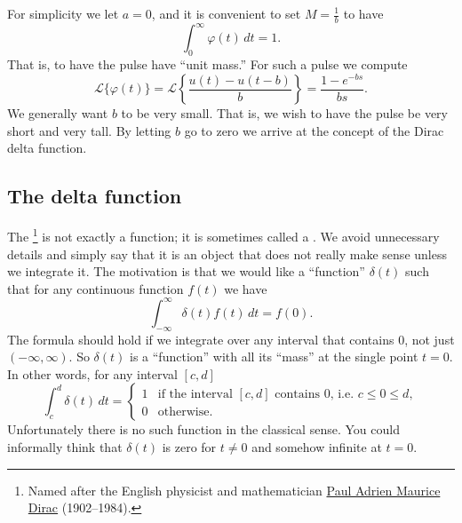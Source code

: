 \documentclass{ximera}
\begin{document}
For simplicity we let $a=0$, and it is convenient to set $M = \frac{1}{b}$ to have
\begin{equation*}
    \int_0^\infty \varphi(t) \,dt = 1 .
\end{equation*}
That is, to have the pulse have ``unit mass.'' For such a pulse we compute
\begin{equation*}
    {\mathcal{L}} \bigl\{ \varphi(t) \bigr\} = {\mathcal{L}} \left\{ \frac{u(t) - u(t-b)}{b}  \right\} = \frac{1 - e^{-bs}}{bs} .
\end{equation*}
We generally want $b$ to be very small.  That is, we wish to have the pulse be very short and very tall.  By letting $b$ go to zero we arrive at the concept of the Dirac delta function.

\subsection{The delta function}

The \emph{}%
\footnote{Named after the English physicist and mathematician \href{https://en.wikipedia.org/wiki/Paul_Dirac}{Paul Adrien Maurice Dirac} (1902--1984).}
is not exactly a function; it is sometimes called a \emph{}.  We avoid unnecessary details and simply say that it is an object that does not really make sense unless we integrate it.  The motivation is that we would like a ``function'' $\delta(t)$ such that for any continuous function $f(t)$ we have
\begin{equation*}
    \int_{-\infty}^\infty \delta(t) f(t) \,dt = f(0) .
\end{equation*}
The formula should hold if we integrate over any interval that contains 0, not just $(-\infty,\infty)$. So $\delta(t)$ is a ``function''  with all its ``mass'' at the single point $t=0$.  In other words, for any interval $[c,d]$
\begin{equation*}
    \int_c^d \delta(t) \,dt = 
    \begin{cases}
        1 & \text{if the interval $[c,d]$ contains 0, i.e.\ } c \leq 0 \leq d, \\
        0 & \text{otherwise.}
    \end{cases}
\end{equation*}
Unfortunately there is no such function in the classical sense.  You could informally think that $\delta(t)$ is zero for $t\not=0$ and somehow infinite at $t=0$.
\end{document}
